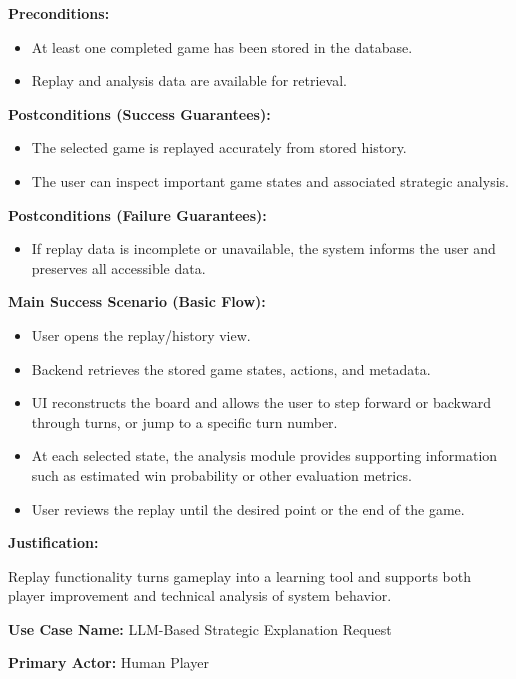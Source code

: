 \documentclass{article}
\begin{document}
\noindent\textbf{Preconditions:}
\begin{itemize}
    \item At least one completed game has been stored in the database.
    \item Replay and analysis data are available for retrieval.
\end{itemize}

\noindent\textbf{Postconditions (Success Guarantees):}
\begin{itemize}
    \item The selected game is replayed accurately from stored history.
    \item The user can inspect important game states and associated strategic analysis.
\end{itemize}

\noindent\textbf{Postconditions (Failure Guarantees):}
\begin{itemize}
    \item If replay data is incomplete or unavailable, the system informs the user and preserves all accessible data.
\end{itemize}

\noindent\textbf{Main Success Scenario (Basic Flow):}
\begin{itemize}
    \item User opens the replay/history view.
    \item Backend retrieves the stored game states, actions, and metadata.
    \item UI reconstructs the board and allows the user to step forward or backward through turns, or jump to a specific turn number.
    \item At each selected state, the analysis module provides supporting information such as estimated win probability or other evaluation metrics.
    \item User reviews the replay until the desired point or the end of the game.
\end{itemize}

\noindent\textbf{Justification:}

Replay functionality turns gameplay into a learning tool and supports both player improvement and technical analysis of system behavior.

\vspace{1em}

\noindent\textbf{Use Case Name:} LLM-Based Strategic Explanation Request

\noindent\textbf{Primary Actor:} Human Player
\end{document}

